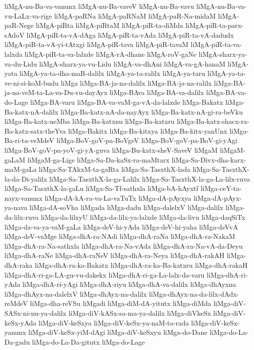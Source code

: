 {liMgA-nu-Ba-va-vanunx
liMgA-nu-Ba-vaveV
liMgA-nu-Ba-vavu
liMgA-nu-Ba-va-vu-LaLx-va-rige
liMgA-paRNa
liMgA-paRNaM
liMgA-paR-Na-midaM
liMgA-paR-Nege
liMgA-piRta
liMgA-piRtaM
liMgA-piR-ta-diMda
liMgA-piR-ta-parx-sAdoV
liMgA-piR-ta-vA-dAga
liMgA-piR-ta-vAda
liMgA-piR-ta-vA-dadudx
liMgA-piR-ta-vA-yi-tAtxgi
liMgA-piR-tava
liMgA-piR-tavaM
liMgA-piR-ta-va-lalxda
liMgA-piR-ta-va-lalxde
liMgA-rA-dhane
liMgA-roV-gaNe
liMgA-sharx-ya-va-du-Lidu
liMgA-sharx-ya-vu-Lidu
liMgA-va-dhAni
liMgA-va-gA-hanaM
liMgA-yata
liMgA-ya-ta-dha-maR-dalilx
liMgA-ya-ta-ralilx
liMgA-ya-taru
liMgA-ya-ta-ve-ni-si-koM-budu
liMga
liMga-BA-ja-na-dalilx
liMga-BA-ja-na-ralilx
liMga-BA-ja-na-veM-ta-La-va-Du-vu-dayAyx
liMga-BAva
liMga-BA-va-dalilx
liMga-BA-va-do-Lage
liMga-BA-varu
liMga-BA-va-vaM-ga-vA-da-lalxde
liMga-Bakatx
liMga-Ba-katx-nA-dalilx
liMga-Ba-katx-nA-da-nayAyx
liMga-Ba-katx-nA-gi-ra-beVku
liMga-Ba-katx-neMba
liMga-Ba-katxnu
liMga-Ba-katxru
liMga-Ba-katx-shacx-ra-Ba-katx-satx-theYva
liMga-Bakitx
liMga-Ba-kitxya
liMga-Ba-kitx-yanUnx
liMga-Ba-ri-ta-veMdeV
liMga-BoV-goV-pa-BoVgeV
liMga-BoV-goV-pa-BoV-gi-yAgi
liMga-BoV-goV-pa-yoV-gi-yA-guva
liMga-Bu-katx-sheV-SaveV
liMgaM
liMgaM-gaLaM
liMgaM-ga-Lige
liMga-Sa-Da-kaSx-ra-maMtarx
liMga-Sa-Divx-dha-karx-maM-gaLa
liMga-Sa-TAkxM-ta-gaRta
liMga-Sa-TasxthX-lada
liMga-Sa-TasxthX-la-da-Di-yalilx
liMga-Sa-TasxthX-la-ga-Lalilx
liMga-Sa-TasxthX-la-ga-La-lilx-ruva
liMga-Sa-TasxthX-la-gaLu
liMga-Sa-Tf-sathxla
liMga-bA-hAyxtf
liMga-ceY-ta-nayx-vanunx
liMga-dA-kA-ra-va-La-vaTuTx
liMga-dA-pAyxya
liMga-dA-pAyx-ya-nava
liMga-dA-soVha
liMgada
liMga-dadu
liMga-dalelxV
liMga-dalilx
liMga-da-lilx-ruva
liMga-da-lilxyU
liMga-da-lilx-ya-lalxde
liMga-da-livu
liMga-daqSiTx
liMga-da-va-ya-vaM-gaLa
liMga-deV-hi-yAda
liMga-deV-hi-yaha
liMga-deVvA
liMga-deV-vaMge
liMga-dhA-ra-NAdi
liMga-dhA-raNa
liMga-dhA-ra-NakaM
liMga-dhA-ra-Na-sathxla
liMga-dhA-ra-Na-vAda
liMga-dhA-ra-Na-vA-da-Deyu
liMga-dhA-raNe
liMga-dhA-raNeV
liMga-dhA-ra-Neya
liMga-dhA-rakAH
liMga-dhA-raka
liMga-dhA-ra-ka-Bakatx
liMga-dhA-ra-ka-Ba-katxru
liMga-dhA-rakaH
liMga-dhA-ri-ga-LA-gu-vu-dakekx
liMga-dhA-ri-ga-La-lalx-da-varu
liMga-dhA-ri-yAda
liMga-dhA-ri-yAgi
liMga-dhA-riyu
liMga-dhA-va-dalilx
liMga-dhAyxna
liMga-dhAyx-na-dalelxV
liMga-dhAyx-na-dalilx
liMga-dhAyx-na-da-lilx-dAdx-reMdeV
liMga-dha-reVSu
liMgadi
liMga-diM-dA-yitutx
liMga-diMda
liMga-diV-SASx-ni-nu-ya-dalilx
liMga-diV-kASx-sa-ma-ya-dalilx
liMga-diVkeSx
liMga-diV-keSx-yAda
liMga-diV-keSxya
liMga-diV-keSx-ya-naM-ta-rada
liMga-diV-keSx-yanunx
liMga-diV-keSx-yiM-dAgi
liMga-diV-keSxyu
liMga-do-Dane
liMga-do-La-Da-gadu
liMga-do-La-Da-gitutx
liMga-do-Lage
}
